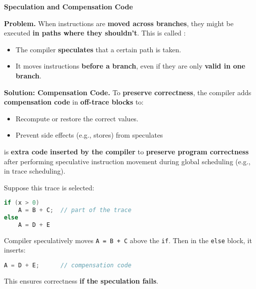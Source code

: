 \highspace
\begin{flushleft}
    \textcolor{Red2}{ \textbf{Speculation and Compensation Code}}
\end{flushleft}
\textcolor{Red2}{ \textbf{Problem.}} When instructions are \textbf{moved across branches}, they might be executed \textbf{in paths where they shouldn't}. This is called :
\begin{itemize}
    \item The compiler \textbf{speculates} that a certain path is taken.
    \item It moves instructions \textbf{before a branch}, even if they are only \textbf{valid in one branch}.
\end{itemize}
\textcolor{Green3}{ \textbf{Solution: Compensation Code.}} To \textbf{preserve correctness}, the compiler adds \textbf{compensation code} in \textbf{off-trace blocks} to:
\begin{itemize}
    \item Recompute or restore the correct values.
    \item Prevent side effects (e.g., stores) from speculates
\end{itemize}

\highspace
\begin{definitionbox}
     is \textbf{extra code inserted by the compiler} to \textbf{preserve program correctness} after performing speculative instruction movement during global scheduling (e.g., in trace scheduling).
\end{definitionbox}

\highspace
\begin{examplebox}
    Suppose this trace is selected:
    \begin{lstlisting}[language=c]
if (x > 0)
    A = B + C;  // part of the trace
else
    A = D + E\end{lstlisting}
    Compiler speculatively moves \texttt{A = B + C} above the \texttt{if}. Then in the \texttt{else} block, it inserts:
    \begin{lstlisting}[language=c]
A = D + E;      // compensation code\end{lstlisting}
    This ensures correctness \textbf{if the speculation fails}.
\end{examplebox}

